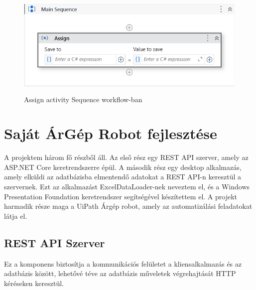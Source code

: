 \documentclass[
]{thesis-ekf}
\theoremstyle{definition}
\theoremstyle{remark}
\begin{document}
	\begin{figure}[!ht]
	\centering
	\includegraphics[height=5cm]{activity}
	\caption{Assign activity Sequence workflow-ban}
	\label{picture-activity}
\end{figure}

\chapter{Saját ÁrGép Robot fejlesztése}
A projektem három fő részből áll. Az első rész egy REST API szerver, amely az ASP.NET Core keretrendszerre épül. A második rész egy desktop alkalmazás, amely elküldi az adatbázisba elmentendő adatokat a REST API-n keresztül a szervernek. Ezt az alkalmazást ExcelDataLoader-nek neveztem el, és a Windows Presentation Foundation keretrendszer segítségével készítettem el. A projekt harmadik része maga a UiPath Árgép robot, amely az automatizálási feladatokat látja el.
\section{REST API Szerver}
Ez a komponens biztosítja a kommunikációs felületet a kliensalkalmazás és az adatbázis között, lehetővé téve az adatbázis műveletek végrehajtását HTTP kéréseken keresztül.
\end{document}
